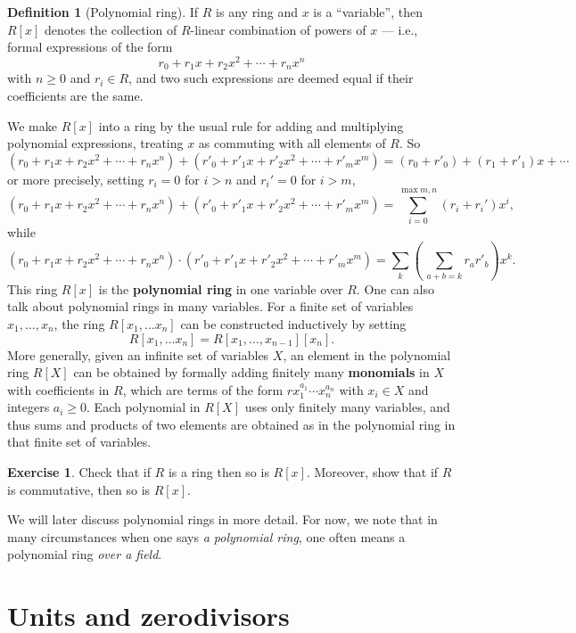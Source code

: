 \documentclass[12pt]{report}
\numberwithin{equation}{section}
\numberwithin{theorem}{chapter}
\theoremstyle{definition}
\newtheorem{definition}[theorem]{Definition}
\newtheorem{exercise}{Exercise}
\newtheorem*{basic properties}{Basic Properties}
\newtheorem*{Important Remark}{Important Remark}
\newcommand{\df}[1]{{\bf #1}\index{#1}}
\begin{document}
\begin{definition}[Polynomial ring]
	If $R$ is any ring and $x$ is a ``variable'', then $R[x]$ denotes the collection of $R$-linear combination of powers of $x$ --- i.e., formal expressions of the form
  $$
  r_0 + r_1x + r_2x^2 + \cdots + r_nx^n
  $$
  with $n \geqslant 0$ and $r_i \in R$, and two such expressions are deemed equal if their coefficients are the same.

We make $R[x]$ into a ring by the usual rule for adding and multiplying polynomial expressions, treating $x$ as commuting with all elements of $R$. So
$$(r_0 + r_1x + r_2x^2 + \cdots + r_nx^n) + (r'_0 + r'_1x + r'_2x^2 + \cdots + r'_mx^m) = (r_0 + r'_0) + (r_1+ r'_1)x  + \cdots$$
or more precisely, setting $r_i = 0$ for $i>n$ and $r_i'=0$ for $i>m$,
$$(r_0 + r_1x + r_2x^2 + \cdots + r_nx^n) + (r'_0 + r'_1x + r'_2x^2 + \cdots + r'_mx^m) = \sum_{i=0}^{\max{m,n}} (r_i+r_i') x^i,$$
while
$$(r_0 + r_1x + r_2x^2 + \cdots + r_nx^n) \cdot (r'_0 + r'_1x + r'_2x^2 + \cdots + r'_mx^m) = \sum_{k} \left( \, \sum_{a+b = k} r_ar'_b \right) x^k.$$
This ring $R[x]$ is the \df{polynomial ring} in one variable over $R$. One can also talk about polynomial rings in many variables. For a finite set of variables $x_1, \ldots, x_n$, the ring $R[x_1, \ldots x_n]$ can be constructed inductively by setting
$$R[x_1, \ldots x_n] = R[x_1, \ldots, x_{n-1}][x_n].$$
More generally, given an infinite set of variables $X$, an element in the polynomial ring $R[X]$ can be obtained by formally adding finitely many \df{monomials} in $X$ with coefficients in $R$, which are terms of the form $rx_1^{a_1} \cdots x_n^{a_n}$ with $x_i \in X$ and integers $a_i \geqslant 0$. Each polynomial in $R[X]$ uses only finitely many variables, and thus sums and products of two elements are obtained as in the polynomial ring in that finite set of variables.
\end{definition}



\begin{exercise}
	Check that if $R$ is a ring then so is $R[x]$. Moreover, show that if $R$ is commutative, then so is $R[x]$.
\end{exercise}

We will later discuss polynomial rings in more detail. For now, we note that in many circumstances when one says \emph{a polynomial ring}, one often means a polynomial ring \emph{over a field}.




\section{Units and zerodivisors}
\end{document}
